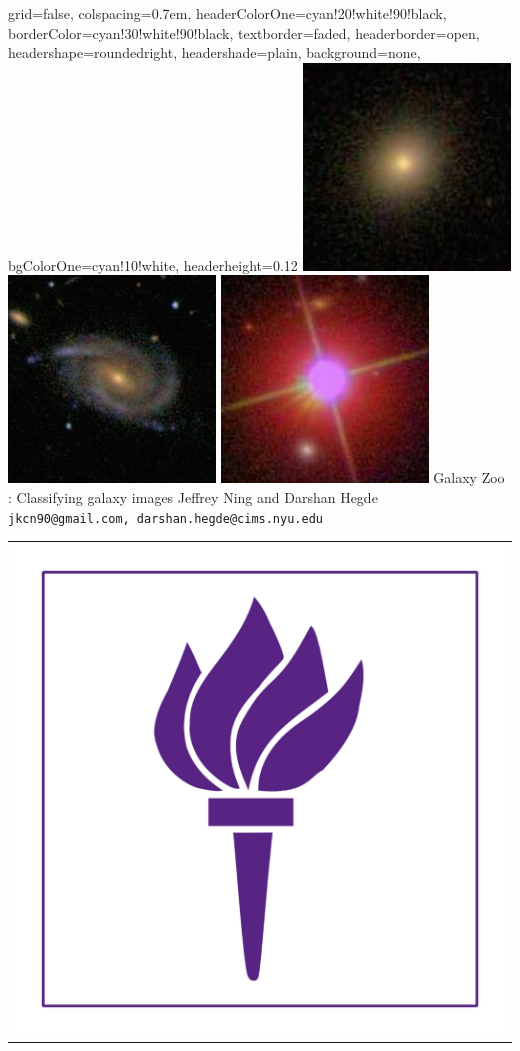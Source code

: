 \documentclass[landscape,a0paper,fontscale=0.292]{baposter}
\begin{document}
\begin{poster}{
 grid=false,
 colspacing=0.7em,
 headerColorOne=cyan!20!white!90!black,
 borderColor=cyan!30!white!90!black,
 textborder=faded,
 headerborder=open,
 headershape=roundedright,
 headershade=plain,
 background=none,
 bgColorOne=cyan!10!white,
 headerheight=0.12\textheight}
 {
      \includegraphics[width=0.08\linewidth]{Class1_1.jpg}
      \includegraphics[width=0.08\linewidth]{Class1_2.jpg}
      \includegraphics[width=0.08\linewidth]{Class1_3.jpg}
 }
 {\sc\Huge Galaxy Zoo : Classifying galaxy images}
 {Jeffrey Ning and Darshan Hegde\\[1em]
 {\texttt{jkcn90@gmail.com, darshan.hegde@cims.nyu.edu}}}
 {
  \begin{tabular}{r}
    \includegraphics[height=0.12\textheight]{NYUTorch.jpg}\\
  \end{tabular}
 }


\end{poster}
\end{document}
